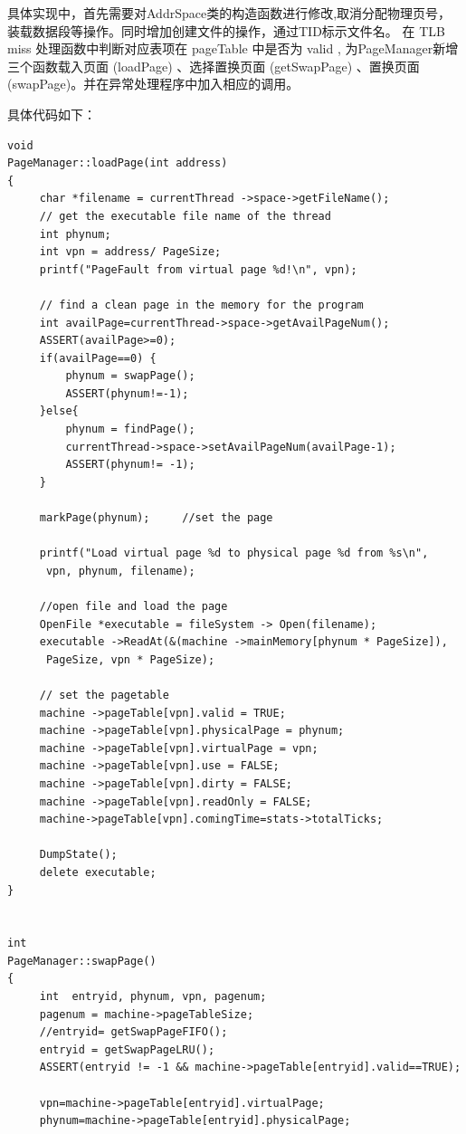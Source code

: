 \documentclass[nofonts]{ctexart}
\begin{document}
具体实现中，首先需要对AddrSpace类的构造函数进行修改,取消分配物理页号，装载数据段等操作。同时增加创建文件的操作，通过TID标示文件名。
在 TLB miss 处理函数中判断对应表项在 pageTable 中是否为 valid ,
为PageManager新增三个函数载入页面 (loadPage) 、选择置换页面 (getSwapPage) 、置换页面 (swapPage)。并在异常处理程序中加入相应的调用。

具体代码如下：

\begin{lstlisting}
void 
PageManager::loadPage(int address)
{      
     char *filename = currentThread ->space->getFileName();      
     // get the executable file name of the thread
     int phynum;
     int vpn = address/ PageSize;
     printf("PageFault from virtual page %d!\n", vpn);
    
     // find a clean page in the memory for the program     
     int availPage=currentThread->space->getAvailPageNum();
     ASSERT(availPage>=0);
     if(availPage==0) {
         phynum = swapPage();
         ASSERT(phynum!=-1);
     }else{
         phynum = findPage();
         currentThread->space->setAvailPageNum(availPage-1);
         ASSERT(phynum!= -1);
     }
     
     markPage(phynum);     //set the page 
   
     printf("Load virtual page %d to physical page %d from %s\n",
      vpn, phynum, filename);
     
     //open file and load the page
     OpenFile *executable = fileSystem -> Open(filename);
     executable ->ReadAt(&(machine ->mainMemory[phynum * PageSize]),
      PageSize, vpn * PageSize);

     // set the pagetable
     machine ->pageTable[vpn].valid = TRUE;
     machine ->pageTable[vpn].physicalPage = phynum;
     machine ->pageTable[vpn].virtualPage = vpn;
     machine ->pageTable[vpn].use = FALSE;
     machine ->pageTable[vpn].dirty = FALSE;
     machine ->pageTable[vpn].readOnly = FALSE;
     machine->pageTable[vpn].comingTime=stats->totalTicks;

     DumpState();
     delete executable;
}


int
PageManager::swapPage()
{
     int  entryid, phynum, vpn, pagenum;
     pagenum = machine->pageTableSize;
     //entryid= getSwapPageFIFO();  
     entryid = getSwapPageLRU();  
     ASSERT(entryid != -1 && machine->pageTable[entryid].valid==TRUE);

     vpn=machine->pageTable[entryid].virtualPage;
     phynum=machine->pageTable[entryid].physicalPage;
    

\end{lstlisting}
\end{document}
